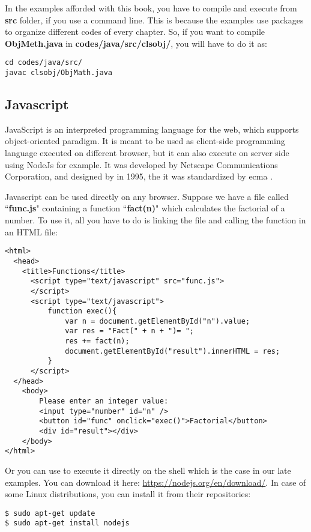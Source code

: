 \documentclass{KodeBook}
\begin{document}
In the examples afforded with this book, you have to compile and execute from \textbf{src} folder, if you use a command line. 
This is because the examples use packages to organize different codes of every chapter. 
So, if you want to compile \textbf{ObjMeth.java} in \textbf{codes/java/src/clsobj/}, you will have  to do it as:
\begin{lstlisting}[style=shellStyle]
cd codes/java/src/
javac clsobj/ObjMath.java 
\end{lstlisting}

\subsection{Javascript}


JavaScript is an interpreted programming language for the web, which supports object-oriented paradigm. 
It is meant to be used as client-side programming language executed on different browser, but it can also execute on server side using NodeJs for example.
It was developed by Netscape Communications Corporation, and designed by  in 1995, the it was standardized by \ac{ecma} \citep{2018-rubens}. 


Javascript can be used directly on any browser. 
Suppose we have a file called ``\textbf{func.js}" containing a function ``\textbf{fact(n)}" which calculates the factorial of a number. 
To use it, all you have to do is linking the file and calling the function in an HTML file:
\begin{lstlisting}[language={[KB]Javascript}, style=codeStyle]
<html>
  <head>
    <title>Functions</title>
      <script type="text/javascript" src="func.js">
      </script>
      <script type="text/javascript">
          function exec(){
              var n = document.getElementById("n").value;
              var res = "Fact(" + n + ")= ";
              res += fact(n);
              document.getElementById("result").innerHTML = res;
          }
      </script>
  </head>
    <body>
        Please enter an integer value: 
        <input type="number" id="n" />
        <button id="func" onclick="exec()">Factorial</button>
        <div id="result"></div>
    </body>
</html>
\end{lstlisting}


Or you can use  to execute it directly on the shell which is the case in our late examples. 
You can download it here: \url{https://nodejs.org/en/download/}. 
In case of some Linux distributions, you can install it from their repositories:
\begin{lstlisting}[style=shellStyle]
$ sudo apt-get update
$ sudo apt-get install nodejs
\end{lstlisting}
\end{document}
